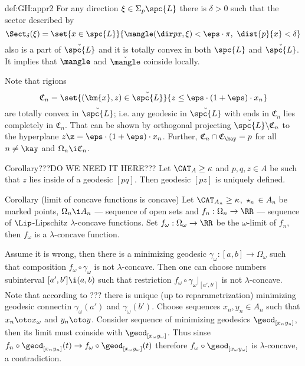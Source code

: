 {\begin{subthm}{def:GH:appr2}
For any direction $\xi\in\Sigma_p\spc{L}$ there is $\delta>0$ such that the sector described by
$$\Sect_\delta(\xi)
=
\set{x\in \spc{L}}{\mangle(\dir p x,\xi)<\eps\cdot\pi,
\ \dist{p}{x}<\delta}$$
also is a part of $\check{\spc{L}}$ and it is totally convex in both $\spc{L}$ and $\check{\spc{L}}$.
It implies that $\mangle$ and $\check\mangle$ coinside locally.













Note that rigions 
$$\mathfrak{C}_n=\set{(\bm{x},z)\in \check{\spc{L}}}
{z\le\eps\cdot(1+\eps)\cdot x_n}$$
are totally convex in $\check{\spc{L}}$;
i.e. any geodesic in $\check{\spc{L}}$ with ends in $\mathfrak{C}_n$ lies completely in $\mathfrak{C}_n$.
That can be shown by orthogonal projecting $\check{\spc{L}}\backslash \mathfrak{C}_n$ to the hyperplane
$z\z=\eps\cdot(1+\eps)\cdot x_n$.
Further, 
$\mathfrak{C}_n\cap \mathfrak{C}_\kay=p$ for all $n\not=\kay$ and
$\Omega_n\i \mathfrak{C}_n$.

\begin{thm}{Corollary}???DO WE NEED IT HERE???
Let $\CAT_A\ge\kappa$ and $p,q,z\in A$ be such that $z$ lies inside of a geodesic $[p q]$. 
Then geodesic $[p z]$ is uniquely defined.
\end{thm}

\begin{thm}{Corollary} (limit of concave functions is concave)
Let $\CAT_{A_n}\ge\kappa$, $\star_n\in A_n$ be marked points, $\Omega_n\i A_n$ --- sequence of open sets and $f_n:\Omega_n\to \RR$ --- sequence of $\Lip$-Lipschitz $\lambda$-concave functions.
Set $f_\omega:\Omega_\omega\to\RR$ be the $\omega$-limit of $f_n$, then $f_\omega$ is a $\lambda$-concave function.
\end{thm}

 Assume it is wrong, then there is a minimizing geodesic $\gamma_\omega:[a,b]\to \Omega_\omega$ such that composition 
$f_\omega\circ\gamma_\omega$ is not $\lambda$-concave.
Then one can choose numbers subinterval $[a',b']\i(a,b)$ such that restriction $f_\omega\circ\gamma_\omega|_{[a',b']}$ is not $\lambda$-concave.
Note that according to ??? there is unique (up to reparametrization) minimizing geodesic connectin $\gamma_\omega(a')$ and $\gamma_\omega(b')$.
Choose sequences $x_n,y_n\in A_n$ such that $x_n\oto x_\omega$ and $y_n\oto y$.
Consider sequence of minimizing geodesics $\geod_{[x_ny_n]}$, then its limit must coinside with $\geod_{[x_\omega y_\omega]}$.
Thus sinse $f_n\circ\geod_{[x_ny_n]}(t)\to f_\omega\circ\geod_{[x_\omega y_\omega]}(t)$ therefore $f_\omega\circ\geod_{[x_\omega y_\omega]}$ is $\lambda$-concave, a contradiction.
\qeds













\end{subthm}}

